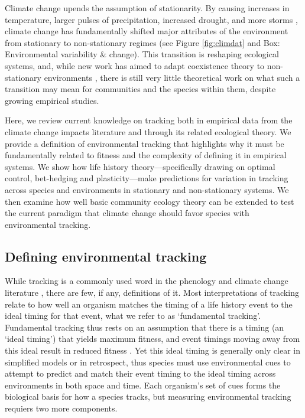\documentclass[11pt,letterpaper]{article}
\begin{document}
Climate change upends the assumption of stationarity. By causing increases in temperature, larger pulses of precipitation, increased drought, and more storms \citep{ipcc2013}, climate change has fundamentally shifted major attributes of the environment from stationary to non-stationary regimes (see Figure \ref{fig:climdat} and Box: Environmental variability \& change). This transition is reshaping ecological systems, and, while new work has aimed to adapt coexistence theory to non-stationary environments \citep{chessonnonstat,volkerass}, there is still very little theoretical work on what such a transition may mean for communities and the species within them, despite growing empirical studies.  %

Here, we review current knowledge on tracking both in empirical data from the climate change impacts literature and through its related ecological theory. We provide a definition of environmental tracking that highlights why it must be fundamentally related to fitness and the complexity of defining it in empirical systems. We show how life history theory---specifically drawing on optimal control, bet-hedging and plasticity---make predictions for variation in tracking across species and environments in stationary and non-stationary systems. We then examine how well basic community ecology theory can be extended to test the current paradigm that climate change should favor species with environmental tracking. 

\subsection{Defining environmental tracking}
While tracking is a commonly used word in the phenology and climate change literature \citep[e.g.,][]{Menzel:2006xn,Cleland:2012,deacy2018}, there are few, if any, definitions of it. Most interpretations of tracking relate to how well an organism matches the timing of a life history event to the ideal timing for that event, what we refer to as `fundamental tracking'. Fundamental tracking thus rests on an assumption that there is a timing (an `ideal timing') that yields maximum fitness, and event timings moving away from this ideal result in reduced fitness \citep[a foundational concept of the trophic mismatch literature,][]{vissergienapp2019}. Yet this ideal timing is generally only clear in simplified models or in retrospect, thus species must use environmental cues to attempt to predict and match their event timing to the ideal timing across environments in both space and time. Each organism's set of cues forms the biological basis for how a species tracks, but measuring environmental tracking requiers two more components.
\end{document}
